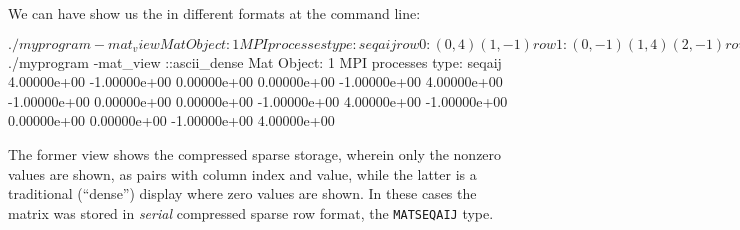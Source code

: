 \begin{marginfigure}
\bigskip
\caption{A parallel \pMat layout on two processes.  Blank entries are zeros, which are not stored because of ``compressed sparse'' storage.}
\label{fig:mpitwomatlayout}
\end{marginfigure}

We can have \PETSc show us the \pMat in different formats at the command line:
\begin{cline}
$ ./myprogram -mat_view
Mat Object: 1 MPI processes
  type: seqaij
row 0: (0, 4)  (1, -1)
row 1: (0, -1)  (1, 4)  (2, -1)
row 2: (1, -1)  (2, 4)  (3, -1)
row 3: (2, -1)  (3, 4)
$ ./myprogram -mat_view ::ascii_dense
Mat Object: 1 MPI processes
  type: seqaij
 4.00000e+00  -1.00000e+00  0.00000e+00  0.00000e+00
 -1.00000e+00  4.00000e+00  -1.00000e+00  0.00000e+00
 0.00000e+00  -1.00000e+00  4.00000e+00  -1.00000e+00
 0.00000e+00  0.00000e+00  -1.00000e+00  4.00000e+00
\end{cline}
The former view shows the compressed sparse storage, wherein only the nonzero values are shown, as pairs with column index and value, while the latter is a traditional (``dense'') display where zero values are shown.  In these cases the matrix was stored in \emph{serial} compressed sparse row format, the \texttt{MATSEQAIJ} type.

